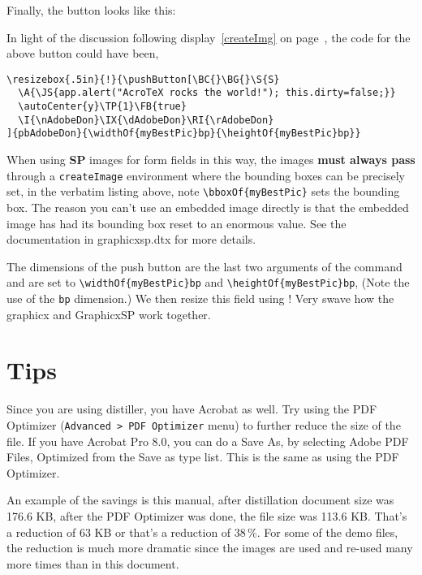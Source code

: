 \documentclass{article}
\let\pkg\textsf
\begin{document}
Finally, the button looks like this: \par\smallskip\noindent
In light of the discussion following display~\eqref{createImg} on page~\pageref*{createImg}, the code for the above
button could have been,
\begin{Verbatim}[xleftmargin=\parindent,fontsize=\small]
\resizebox{.5in}{!}{\pushButton[\BC{}\BG{}\S{S}
  \A{\JS{app.alert("AcroTeX rocks the world!"); this.dirty=false;}}
  \autoCenter{y}\TP{1}\FB{true}
  \I{\nAdobeDon}\IX{\dAdobeDon}\RI{\rAdobeDon}
]{pbAdobeDon}{\widthOf{myBestPic}bp}{\heightOf{myBestPic}bp}}
\end{Verbatim}
When using \textbf{SP} images for form fields in this way, the images
\textbf{must always pass} through a \texttt{createImage} environment where the
bounding boxes can be precisely set, in the verbatim listing above,
note \verb!\bboxOf{myBestPic}! sets the bounding box. The reason you
can't use an embedded image directly is that the embedded image has
had its bounding box reset to an enormous value. See the
documentation in graphicxsp.dtx for more details.

The dimensions of the push button are the last two arguments of the
 command and are set to \verb!\widthOf{myBestPic}bp!
and \verb!\heightOf{myBestPic}bp!, (Note the use of the \texttt{bp}
dimension.)  We then resize this field using ! Very
swave how the graphicx and \pkg{GraphicxSP} work together.

\section{Tips}

Since you are using distiller, you have Acrobat as well. Try using
the PDF Optimizer (\texttt{Advanced > PDF Optimizer} menu) to
further reduce the size of the file. If you have Acrobat Pro 8.0,
you can do a Save As, by selecting Adobe PDF Files, Optimized from
the Save as type list. This is the same as using the PDF Optimizer.

An example of the savings is this manual, after distillation
document size was 176.6 KB, after the PDF Optimizer was done, the
file size was 113.6 KB. That's a reduction of 63 KB or that's a
reduction of 38\,\%. For some of the demo files, the reduction is
much more dramatic since the images are used and re-used many more
times than in this document.
\end{document}
